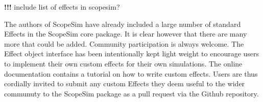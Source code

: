 \textbf{!!!} include list of effects in scopesim?

The authors of ScopeSim have already included a large number of standard Effects in the ScopeSim core package.
It is clear however that there are many more that could be added.
Community participation is always welcome.
The Effect object interface has been intentionally kept light weight to encourage users to implement their own custom effects for their own simulations.
The online documentation contains a tutorial on how to write custom effects.
Users are thus cordially invited to submit any custom Effects they deem useful to the wider communuty to the ScopeSim package as a pull request via the Github repository.
